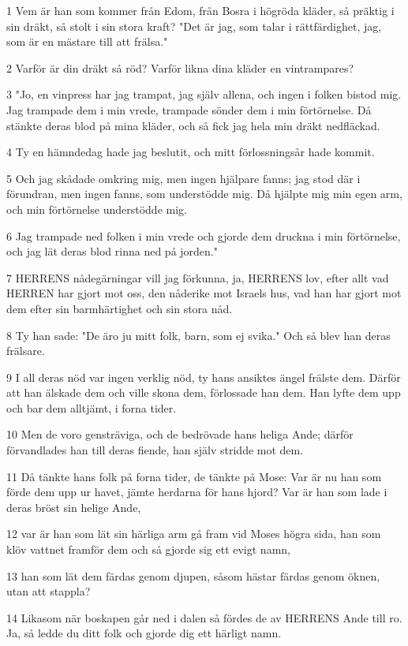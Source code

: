 \par 1 Vem är han som kommer från Edom, från Bosra i högröda kläder, så präktig i sin dräkt, så stolt i sin stora kraft? "Det är jag, som talar i rättfärdighet, jag, som är en mästare till att frälsa."
\par 2 Varför är din dräkt så röd? Varför likna dina kläder en vintrampares?
\par 3 "Jo, en vinpress har jag trampat, jag själv allena, och ingen i folken bistod mig. Jag trampade dem i min vrede, trampade sönder dem i min förtörnelse. Då stänkte deras blod på mina kläder, och så fick jag hela min dräkt nedfläckad.
\par 4 Ty en hämndedag hade jag beslutit, och mitt förlossningsår hade kommit.
\par 5 Och jag skådade omkring mig, men ingen hjälpare fanns; jag stod där i förundran, men ingen fanns, som understödde mig. Då hjälpte mig min egen arm, och min förtörnelse understödde mig.
\par 6 Jag trampade ned folken i min vrede och gjorde dem druckna i min förtörnelse, och jag lät deras blod rinna ned på jorden."
\par 7 HERRENS nådegärningar vill jag förkunna, ja, HERRENS lov, efter allt vad HERREN har gjort mot oss, den nåderike mot Israels hus, vad han har gjort mot dem efter sin barmhärtighet och sin stora nåd.
\par 8 Ty han sade: "De äro ju mitt folk, barn, som ej svika." Och så blev han deras frälsare.
\par 9 I all deras nöd var ingen verklig nöd, ty hans ansiktes ängel frälste dem. Därför att han älskade dem och ville skona dem, förlossade han dem. Han lyfte dem upp och bar dem alltjämt, i forna tider.
\par 10 Men de voro gensträviga, och de bedrövade hans heliga Ande; därför förvandlades han till deras fiende, han själv stridde mot dem.
\par 11 Då tänkte hans folk på forna tider, de tänkte på Mose: Var är nu han som förde dem upp ur havet, jämte herdarna för hans hjord? Var är han som lade i deras bröst sin helige Ande,
\par 12 var är han som lät sin härliga arm gå fram vid Moses högra sida, han som klöv vattnet framför dem och så gjorde sig ett evigt namn,
\par 13 han som lät dem färdas genom djupen, såsom hästar färdas genom öknen, utan att stappla?
\par 14 Likasom när boskapen går ned i dalen så fördes de av HERRENS Ande till ro. Ja, så ledde du ditt folk och gjorde dig ett härligt namn.
